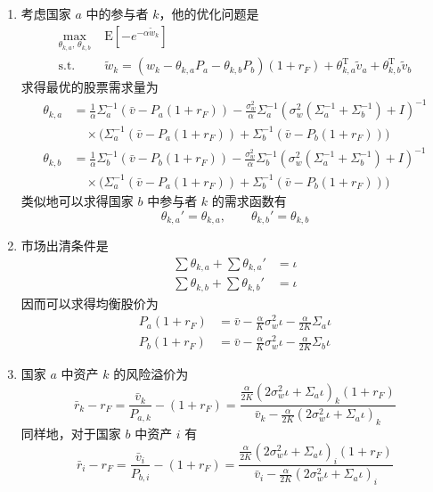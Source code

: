 \begin{solution}
\begin{enumerate}[label=(\alph*)]
    \item 考虑国家 $a$ 中的参与者 $k$，他的优化问题是
    \[
        \begin{aligned}
            \max_{\theta_{k,a},\,\theta_{k,b}}\;&\mathrm{E}[-e^{-\alpha\tilde{w}_{k}}]\\
            \text{s.t.}\;&\tilde{w}_{k}=(w_{k}-\theta_{k,a}P_{a}-\theta_{k,b}P_{b})(1+r_{F})+\theta_{k,a}^{\mathrm{T}}\tilde{v}_{a}+\theta_{k,b}^{\mathrm{T}}\tilde{v}_{b}
        \end{aligned}
    \]
    求得最优的股票需求量为
    \[
        \begin{aligned}
            \theta_{k,a}&=\frac{1}{\alpha}\Sigma_{a}^{-1}(\bar{v}-P_{a}(1+r_{F}))-\frac{\sigma_{w}^{2}}{\alpha}\Sigma_{a}^{-1}(\sigma_{w}^{2}(\Sigma_{a}^{-1}+\Sigma_{b}^{-1})+I)^{-1}\\
            &\quad\times\bigl(\Sigma_{a}^{-1}(\bar{v}-P_{a}(1+r_{F}))+\Sigma_{b}^{-1}(\bar{v}-P_{b}(1+r_{F}))\bigr)\\
            \theta_{k,b}&=\frac{1}{\alpha}\Sigma_{b}^{-1}(\bar{v}-P_{b}(1+r_{F}))-\frac{\sigma_{w}^{2}}{\alpha}\Sigma_{b}^{-1}(\sigma_{w}^{2}(\Sigma_{a}^{-1}+\Sigma_{b}^{-1})+I)^{-1}\\
            &\quad\times\bigl(\Sigma_{a}^{-1}(\bar{v}-P_{a}(1+r_{F}))+\Sigma_{b}^{-1}(\bar{v}-P_{b}(1+r_{F}))\bigr)
        \end{aligned}
    \]
    类似地可以求得国家 $b$ 中参与者 $k$ 的需求函数有
    \[
        \theta_{k,a}'=\theta_{k,a},\qquad\theta_{k,b}'=\theta_{k,b}
    \]

    \item 市场出清条件是
    \[
        \begin{aligned}
            \sum\theta_{k,a}+\sum\theta_{k,a}'&=\iota\\
            \sum\theta_{k,b}+\sum\theta_{k,b}'&=\iota
        \end{aligned}
    \]
    因而可以求得均衡股价为
    \[
        \begin{aligned}
            P_{a}(1+r_{F})&=\bar{v}-\frac{\alpha}{K}\sigma_{w}^{2}\iota-\frac{\alpha}{2K}\Sigma_{a}\iota\\
            P_{b}(1+r_{F})&=\bar{v}-\frac{\alpha}{K}\sigma_{w}^{2}\iota-\frac{\alpha}{2K}\Sigma_{b}\iota
        \end{aligned}
    \]

    \item 国家 $a$ 中资产 $k$ 的风险溢价为
    \[
        \bar{r}_{k}-r_{F}=\frac{\bar{v}_{k}}{P_{a,k}}-(1+r_{F})=\frac{\frac{\alpha}{2K}(2\sigma_{w}^{2}\iota+\Sigma_{a}\iota)_{k}(1+r_{F})}{\bar{v}_{k}-\frac{\alpha}{2K}(2\sigma_{w}^{2}\iota+\Sigma_{a}\iota)_{k}}
    \]
    同样地，对于国家 $b$ 中资产 $i$ 有
    \[
        \bar{r}_{i}-r_{F}=\frac{\bar{v}_{i}}{P_{b,i}}-(1+r_{F})=\frac{\frac{\alpha}{2K}(2\sigma_{w}^{2}\iota+\Sigma_{a}\iota)_{i}(1+r_{F})}{\bar{v}_{i}-\frac{\alpha}{2K}(2\sigma_{w}^{2}\iota+\Sigma_{a}\iota)_{i}}
    \]


\end{enumerate}
\end{solution}
